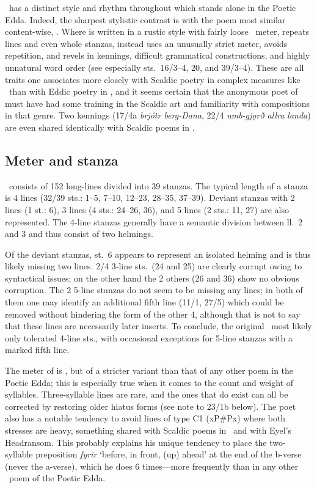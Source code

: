 \Hymiskvida\ has a distinct style and rhythm throughout which stands alone in the Poetic Edda.  Indeed, the sharpest stylistic contrast is with the poem most similar content-wise, .  Where  is written in a rustic style with fairly loose \Fornyrdislag\ meter, repeats lines and even whole stanzas,  instead uses an unusually strict meter, avoids repetition, and revels in kennings, difficult grammatical constructions, and highly unnatural word order (see especially sts.~16/3--4, 20, and 39/3--4).  These are all traits one associates more closely with Scaldic poetry in complex measures like \Drottkvett\ than with Eddic poetry in \Fornyrdislag, and it seems certain that the anonymous poet of  must have had some training in the Scaldic art and familiarity with compositions in that genre.  Two kennings (17/4a \emph{brjótr berg-Dana}, 22/4 \emph{umb-gjǫrð allra landa}) are even shared identically with Scaldic poems in \Drottkvett.

\subsection{Meter and stanza}

\Hymiskvida\ consists of 152 long-lines divided into 39 stanzas.  The typical length of a stanza is 4 lines (32/39 sts.: 1--5, 7--10, 12--23, 28--35, 37--39).  Deviant stanzas with 2 lines (1 st.: 6), 3 lines (4 sts.: 24--26, 36), and 5 lines (2 sts.: 11, 27) are also represented.  The 4-line stanzas generally have a semantic division between ll.~2 and 3 and thus consist of two helmings.

Of the deviant stanzas, st.~6 appears to represent an isolated helming and is thus likely missing two lines.
2/4 3-line sts.~(24 and 25) are clearly corrupt owing to syntactical issues; on the other hand the 2 others (26 and 36) show no obvious corruption.
The 2 5-line stanzas do not seem to be missing any lines; in both of them one may identify an additional fifth line (11/1, 27/5) which could be removed without hindering the form of the other 4, although that is not to say that these lines are necessarily later inserts.  To conclude, the original \Hymiskvida\ most likely only tolerated 4-line sts., with occasional exceptions for 5-line stanzas with a marked fifth line.

The meter of  is \Fornyrdislag, but of a stricter variant than that of any other poem in the Poetic Edda; this is especially true when it comes to the count and weight of syllables.  Three-syllable lines are rare, and the ones that do exist can all be corrected by restoring older hiatus forms (see note to 23/1b below).  The poet also has a notable tendency to avoid lines of type C1 (xP\#Px) where both stresses are heavy, something shared with Scaldic poems in \Kviduhattr\ and with Eyel’s Headransom.  This probably explains his unique tendency to place the two-syllable preposition \emph{fyrir} ‘before, in front, (up) ahead’ at the end of the b-verse (never the a-verse), which he does 6 times---more frequently than in any other \Fornyrdislag\ poem of the Poetic Edda.

